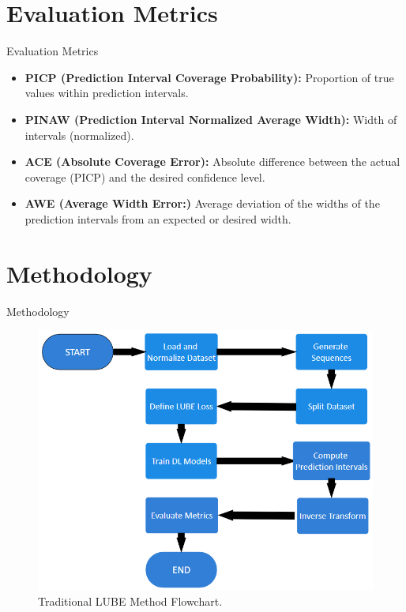 \documentclass[xcolor=dvipsnames,aspectratio=169]{beamer}
\begin{document}
\section{Evaluation Metrics}
\begin{frame}{Evaluation Metrics}
\begin{itemize}
    \item \textbf{PICP (Prediction Interval Coverage Probability):} Proportion of true values within prediction intervals.
    \item \textbf{PINAW (Prediction Interval Normalized Average Width):} Width of intervals (normalized).
    \item \textbf{ACE (Absolute Coverage Error):} Absolute difference between the actual coverage (PICP) and the desired confidence level.
    \item \textbf{AWE (Average Width Error:)} Average deviation of the widths of the prediction intervals from an expected or desired width.
\end{itemize}
    
\end{frame}






\section{Methodology}
\begin{frame}{Methodology}
\begin{figure}
    \centering
    \includegraphics[width=0.5\linewidth]{TLUBE.png}
    \caption{Traditional LUBE Method Flowchart.}
    \label{fig:enter-label}
\end{figure}
\end{frame}
\end{document}
